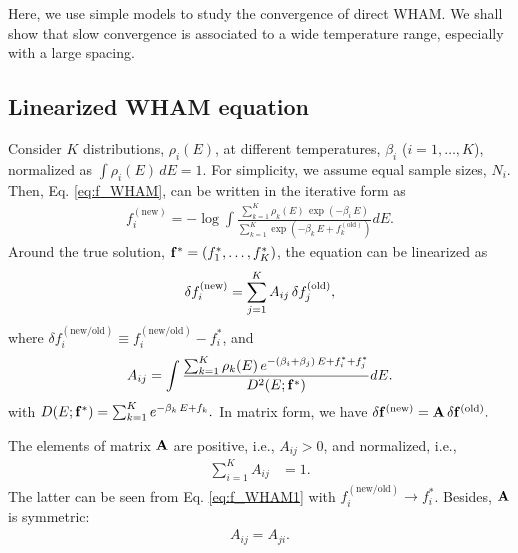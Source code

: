 \documentclass[aip,jcp,preprint,superscriptaddress]{revtex4-1}
\begin{document}
Here, we use simple models
to study the convergence of direct WHAM.
%
We shall show that
slow convergence is
associated to a wide temperature range,
especially with a large spacing.





\subsection{Linearized WHAM equation}



Consider $K$ distributions, $\rho_i(E)$,
at different temperatures,
$\beta_i$ ($i = 1, \dots, K$),
%
normalized as
%
$
\int \rho_i(E) \, dE = 1.
$
%
%
%
For simplicity,
we assume equal sample sizes, $N_i$.
%
Then,
Eq. \eqref{eq:f_WHAM},
can be written
in the iterative form as
%
\begin{align}
f_i^\mathrm{(new)}
=
-\log
\int
\frac
{
  \sum_{k=1}^K \rho_k(E) \, \exp(-\beta_i \, E)
}
{
  \sum_{k=1}^K
  \exp(
    -\beta_k \, E + f_k^\mathrm{(old)}
  )
}
dE.
\label{eq:f_WHAM1}
\end{align}
%
Around the true solution,
$\mathbf{f}^* = (f_1^*, \dots, f_K^*)$,
the equation can be linearized as
%
\begin{align}
\delta f_i^\mathrm{(new)}
=
\sum_{j = 1}^K
A_{ij} \,
\delta f_j^\mathrm{(old)},
\notag
\end{align}
%
where
%
$\delta f_i^\mathrm{(new/old)}
\equiv f_i^\mathrm{(new/old)} - f_i^*$,
%
and
\begin{align}
  A_{ij}
=
\int
\frac
{
  \sum_{k=1}^K \rho_k(E) \,
    e^{
      -(\beta_i + \beta_j) \, E + f_i^* + f_j^*
    }
}
{
  D^2(E; \mathbf{f}^*)
}
dE.
\label{eq:Aij}
\end{align}
%
with
$
D(E; \mathbf{f}^*)
=
\sum_{k = 1}^K
  e^{
    -\beta_k \, E + f_k
  }.
$
%
In matrix form, we have
%
$
\delta \mathbf{f}^\mathrm{(new)}
=
\mathbf{A} \,
\delta \mathbf{f}^\mathrm{(old)}.
$



The elements of matrix $\mathbf{A}$
are positive, i.e.,
%
$A_{ij} > 0$,
and normalized, i.e.,
%
\begin{align}
\sum_{i = 1}^K A_{ij} &= 1.
\label{eq:Aij_normalization}
\end{align}
%
The latter can be seen from
Eq. \eqref{eq:f_WHAM1}
with
$f_i^\mathrm{(new/old)} \rightarrow f_i^*$.
%
Besides,
$\mathbf{A}$ is symmetric:
%
\begin{align}
  A_{ij} = A_{ji}.
\label{eq:Aij_symmetry}
\end{align}
%
\end{document}
